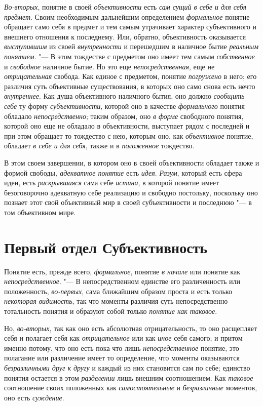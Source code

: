 {{\em Во-вторых}, понятие в
своей {\em объективности}
есть {\em сам сущий в себе
и для себя предмет}. Своим необходимым дальнейшим
определением {\em формальное}
понятие обращает само себя в предмет и тем самым утрачивает
характер субъективного и внешнего отношения к последнему. Или, обратно,
объективность оказывается
{\em выступившим} из
своей {\em внутренности}
и перешедшим в наличное бытие
{\em реальным понятием}. "---
В этом тождестве с предметом оно имеет тем самым
{\em собственное} и
{\em свободное} наличное
бытие. Но это еще
{\em непосредственная},
еще не
{\em отрицательная}
свобода. Как единое с предметом, понятие
{\em погружено} в него;
его различия суть объективные существования, в которых оно само снова есть
нечто {\em внутреннее}.
Как душа объективного наличного бытия, оно должно
{\em сообщить себе} ту
форму {\em субъективности},
которой оно в качестве
{\em формального} понятия
обладало {\em непосредственно};
таким образом, оно {\em в
форме} свободного понятия, которой оно еще не обладало в
объективности, выступает рядом с последней и при этом обращает то тождество
с нею, которым оно, как
{\em объективное}
понятие, обладает {\em в
себе и для себя}, также и в
{\em положенное}
тождество.

В этом своем завершении, в котором оно в своей объективности
обладает также и формой свободы{\em ,
адекватное понятие} есть
{\em идея}.
{\em Разум}, который есть
сфера идеи, есть {\em раскрывшаяся}
сама себе {\em истина},
в которой понятие имеет безоговорочно адекватную себе
реализацию и свободно постольку, поскольку оно познает этот свой
объективный мир в своей субъективности и последнюю "--- в том
объективном мире.

\clearpage\part[Первый отдел\newline СУБЪЕКТИВНОСТЬ]{Первый отдел Субъективность}
Понятие есть, прежде всего,
{\em формальное}, понятие
{\em в начале} или
понятие как {\em непосредственное}. "---
В непосредственном единстве его различенность или
положенность, {\em во-первых},
сама ближайшим образом проста и есть только
{\em некоторая видимость},
так что моменты различия суть непосредственно тотальность
понятия и образуют собой только
{\em понятие как таковое}.

Но, {\em во-вторых},
так как оно есть абсолютная отрицательность, то оно
расщепляет себя и полагает себя как
{\em отрицательное} или
как {\em иное} себя
самого; и притом именно потому, что оно есть пока что лишь
{\em непосредственное}
понятие, это полагание или различение имеет то определение,
что моменты оказываются
{\em безразличными друг к другу}
и каждый из них становится сам по себе; единство понятия
остается в этом {\em разделении}
лишь внешним соотношением. Как
{\em таковое} соотношение
своих положенных как
{\em самостоятельные} и
{\em безразличные}
моментов, оно есть
{\em суждение}.

}
